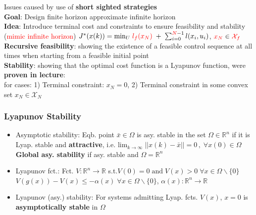 Issues caused by use of \rightarrow \textbf{short sighted strategies}\\
\textbf{Goal}: Design finite horizon \rightarrow approximate infinite horizon\\
\textbf{Idea}: Introduce terminal cost and constraints to ensure feasibility and stability (\textcolor{red}{mimic infinite horizon})
$J^*(x(k))= \text{min}_U \;\textcolor{red}{l_f(x_N)}\;+\;\sum_{i=0}^{\textcolor{red}{N}-1}l(x_i,u_i)$, $\textcolor{red}{x_N}\in\textcolor{red}{\mathcal{X}_f}$\\

\textbf{Recursive feasibility}: showing the existence of a feasible control sequence at all times when starting from a feasible initial point\\
\textbf{Stability}: showing that the optimal cost function is a Lyapunov function, were \textbf{proven in lecture}:\\ 
for cases: 1) Terminal constraint: $x_N=0$, 2) Terminal constraint in some convex set $x_N\in\mathcal{X}_N$\\


\subsubsection{Lyapunov Stability}
\begin{itemize}
    \item Asymptotic stability: Eqb. point $\bar{x}\in\Omega$ is asy. stable in the set $\Omega\in\mathbb{R}^n$ if it is Lyap. stable and \textbf{attractive}, i.e.
    $\text{lim}_{k\rightarrow\infty}\;||x(k)-\bar{x}||=0\,,\;\forall x(0)\in\Omega$\\
    \textbf{Global asy. stability} if asy. stable and $\Omega=\mathbb{R}^n$
    \item Lyapunov fct.: Fct. $V:\mathbb{R}^n\rightarrow\mathbb{R}$ s.t.$V(0)=0\; \text{and}\;V(x)>0\; \forall x\in\Omega\backslash\{0\}$\\
    $V(g(x))-V(x)\leq-\alpha(x)\;\forall x\in\Omega\backslash\{0\}$, $\alpha(x):\mathbb{R}^n\rightarrow\mathbb{R}$
    \item Lyapunov (asy.) stability: For systems admitting Lyap. fcts. $V(x)$, $x=0$ is \textbf{asymptotically stable} in $\Omega$
\end{itemize}
